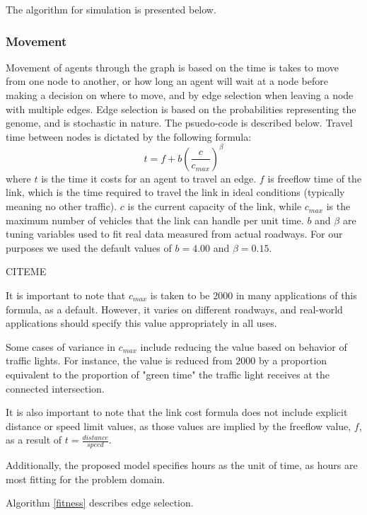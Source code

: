 \documentclass{sig-alternate-05-2015}
\begin{document}
				The algorithm for simulation is presented below.
			\subsubsection{Movement}
				Movement of agents through the graph is based on the time is takes to move from one node to another, or how long an agent will wait at a node before making a decision on where to move, and by edge selection when leaving a node with multiple edges. Edge selection is based on the probabilities representing the genome, and is stochastic in nature. The psuedo-code is described below. Travel time between nodes is dictated by the following formula:
				\begin{equation}
				t = f + b(\frac{c}{c_{max}})^{\beta}
				\end{equation} \cite{Horowitz1991}
				where $t$ is the time it costs for an agent to travel an edge. $f$ is freeflow time of the link, which is the time required to travel the link in ideal conditions (typically meaning no other traffic). $c$ is the current capacity of the link, while $c_{max}$ is the maximum number of vehicles that the link can handle per unit time. $b$ and $\beta$ are tuning variables used to fit real data measured from actual roadways. For our purposes we used the default values of $b = 4.00$ and $\beta = 0.15$.
				
				CITEME 
				
				It is important to note that $c_{max}$ is taken to be $2000$ in many applications of this formula, as a default. However, it varies on different roadways, and real-world applications should specify this value appropriately in all uses. 
				
				Some cases of variance in $c_{max}$ include reducing the value based on behavior of traffic lights. For instance, the value is reduced from $2000$ by a proportion equivalent to the proportion of "green time" the traffic light receives at the connected intersection.
				
				It is also important to note that the link cost formula does not include explicit distance or speed limit values, as those values are implied by the freeflow value, $f$, as a result of $t = \frac{distance}{speed}$. 
				
				Additionally, the proposed model specifies hours as the unit of time, as hours are most fitting for the problem domain. 
				
				Algorithm \ref{fitness} describes edge selection.
				
\end{document}
